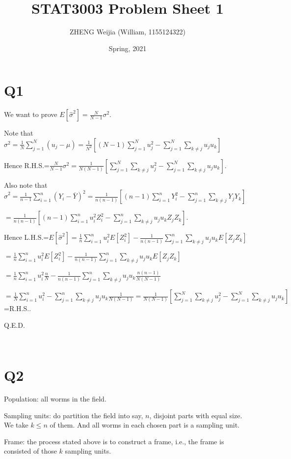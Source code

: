 \documentclass[12pt]{article}%
\begin{document}
\title{STAT3003 Problem Sheet 1}
\author{ZHENG Weijia (William, 1155124322)}
\date{Spring, 2021}
\maketitle



\section{Q1}

We want to prove $E[\hat{\sigma}^2]=\frac{N}{N-1}\sigma^2.$

Note that $\sigma^2=\frac{1}{N}\sum_{j=1}^{N}(u_j-\mu)=\frac{1}{N^2}[(N-1)\sum_{j=1}^{N}u_j^2-\sum_{j=1}^{N}\sum_{k\neq j}u_ju_k]$

Hence R.H.S.=$\frac{N}{N-1}\sigma^2=\frac{1}{N(N-1)}[\sum_{j=1}^{N}\sum_{k\neq j}u_j^2-\sum_{j=1}^{N}\sum_{k\neq j}u_ju_k].$

Also note that $\hat{\sigma}^2=\frac{1}{n-1}\sum_{i=1}^{n}(Y_i-\bar{Y})^2=\frac{1}{n(n-1)}[(n-1)\sum_{i=1}^{n}Y_i^2-\sum_{j=1}^{n}\sum_{k\neq j}Y_jY_k]$

$=\frac{1}{n(n-1)}[(n-1)\sum_{i=1}^{n}u_i^2Z_i^2-\sum_{j=1}^{n}\sum_{k\neq j}u_ju_kZ_jZ_k].$

Hence L.H.S.=$E[\hat{\sigma}^2]=\frac{1}{n}\sum_{i=1}^{n}u_i^2E[Z_i^2]-\frac{1}{n(n-1)}\sum_{j=1}^{n}\sum_{k\neq j}u_ju_kE[Z_jZ_k]$

$=\frac{1}{n}\sum_{i=1}^{n}u_i^2E[Z_i^2]-\frac{1}{n(n-1)}\sum_{j=1}^{n}\sum_{k\neq j}u_ju_kE[Z_jZ_k]$

$=\frac{1}{n}\sum_{i=1}^{n}u_i^2\frac{n}{N}-\frac{1}{n(n-1)}\sum_{j=1}^{n}\sum_{k\neq j}u_ju_k\frac{n(n-1)}{N(N-1)}$

$=\frac{1}{N}\sum_{i=1}^{n}u_i^2-\sum_{j=1}^{n}\sum_{k\neq j}u_ju_k\frac{1}{N(N-1)}=\frac{1}{N(N-1)}[\sum_{j=1}^{N}\sum_{k\neq j}u_j^2-\sum_{j=1}^{N}\sum_{k\neq j}u_ju_k]$=R.H.S..

Q.E.D.

~\ 

\section{Q2}
Population: all worms in the field. 

Sampling units: do partition the field into say, $n$, disjoint parts with equal size. We take $k\leq n$ of them. And all worms in each chosen part is a sampling unit.

Frame: the process stated above is to construct a frame, i.e., the frame is consisted of those $k$ sampling units.
\end{document}
